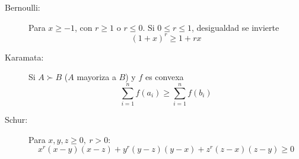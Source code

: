 \begin{description}
    \item[Bernoulli:] Para $x \ge -1$, con $r \ge 1$ o $r \le 0$. Si $0 \le r \le 1$,  desigualdad se invierte
    $$(1 + x)^r \ge 1 + rx$$ 
    
    \item[Karamata:] Si $A \succ B$ ($A$ mayoriza a $B$) y $f$ es convexa 
    $$ \sum_{i=1}^n f(a_i) \ge \sum_{i=1}^n f(b_i)$$
    
    \item[Schur:] Para $x,y,z \ge 0,\  r > 0$:
    $$x^r(x - y)(x - z) + y^r(y - z)(y - x) + z^r(z - x)(z - y) \ge 0$$
\end{description}